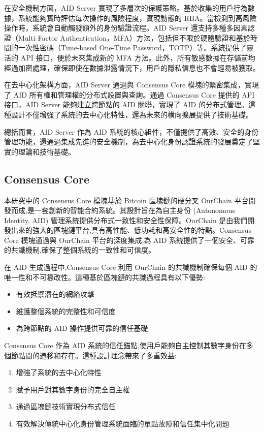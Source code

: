 在安全機制方面，AID Server 實現了多層次的保護策略。基於收集的用戶行為數據，系統能夠實時評估每次操作的風險程度，實現動態的 RBA。當檢測到高風險操作時，系統會自動觸發額外的身份驗證流程。AID Server 還支持多種多因素認證（Multi-Factor Authentication，MFA）方法，包括但不限於硬體驗證和基於時間的一次性密碼（Time-based One-Time Password，TOTP）等。系統提供了靈活的 API 接口，便於未來集成新的 MFA 方法。此外，所有敏感數據在存儲前均經過加密處理，確保即使在數據泄露情況下，用戶的隱私信息也不會輕易被獲取。

在去中心化架構方面，AID Server 通過與 Consensus Core 模塊的緊密集成，實現了 AID 所有權和管理權的分布式設置與查詢。通過 Consensus Core 提供的 API 接口，AID Server 能夠建立跨節點的 AID 關聯，實現了 AID 的分布式管理。這種設計不僅增強了系統的去中心化特性，還為未來的横向擴展提供了技術基礎。

總括而言，AID Server 作為 AID 系統的核心組件，不僅提供了高效、安全的身份管理功能，還通過集成先進的安全機制，為去中心化身份認證系統的發展奠定了堅實的理論和技術基礎。

\subsection{Consensus Core}

本研究中的 Consensus Core 模塊基於 Bitcoin 區塊鏈的硬分叉 OurChain 平台開發而成,是一套創新的智能合約系統。其設計旨在為自主身份 (Autonomous Identity, AID) 管理系統提供分布式一致性和安全性保障。OurChain 是由我們開發出來的強大的區塊鏈平台,具有高性能、低功耗和高安全性的特點。Consensus Core 模塊通過與 OurChain 平台的深度集成,為 AID 系統提供了一個安全、可靠的共識機制,確保了整個系統的一致性和可信度。

在 AID 生成過程中,Consensus Core 利用 OurChain 的共識機制確保每個 AID 的唯一性和不可篡改性。這種基於區塊鏈的共識過程具有以下優勢:

\begin{itemize}
  \item 有效抵禦潛在的網絡攻擊
  \item 維護整個系統的完整性和可信度
  \item 為跨節點的 AID 操作提供可靠的信任基礎
\end{itemize}

Consensus Core 作為 AID 系統的信任錨點,使用戶能夠自主控制其數字身份在多個節點間的遷移和存在。這種設計理念帶來了多重效益:

\begin{enumerate}
  \item 增強了系統的去中心化特性
  \item 賦予用戶對其數字身份的完全自主權
  \item 通過區塊鏈技術實現分布式信任
  \item 有效解決傳統中心化身份管理系統面臨的單點故障和信任集中化問題
\end{enumerate}

